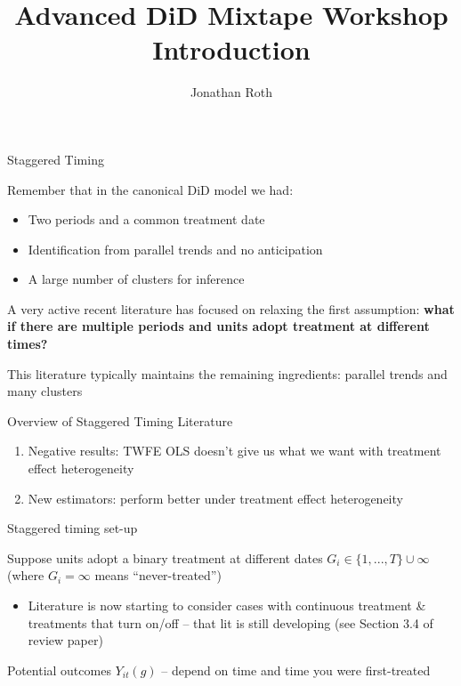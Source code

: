 \documentclass[aspectratio = 169, 13pt]{beamer}
\author{Jonathan Roth}
\title[Advanced DiD Mixtape Workshop]{Advanced DiD Mixtape Workshop \\ Introduction}
\begin{document}

\begin{frame}{Staggered Timing}
  \begin{wideitemize}
    \item
    Remember that in the canonical DiD model we had:

    \begin{itemize}
      \item
            Two periods and a common treatment date

      \item
            Identification from parallel trends and no anticipation

      \item
            A large number of clusters for inference
    \end{itemize}

    \item
    A very active recent literature has focused on relaxing the first assumption: \textbf{what if there are multiple periods and units adopt treatment at different times?}

    \item
    This literature typically maintains the remaining ingredients: parallel trends and many clusters

  \end{wideitemize}

\end{frame}


\begin{frame}{Overview of Staggered Timing Literature}

  \begin{enumerate}
    \item
          Negative results: TWFE OLS doesn't give us what we want with treatment effect heterogeneity

    \item
          New estimators: perform better under treatment effect heterogeneity
  \end{enumerate}


\end{frame}

\begin{frame}{Staggered timing set-up}
  \begin{wideitemize}

    \item
    Suppose units adopt a binary treatment at different dates $G_i \in \{1,...,T \} \cup \infty$ (where $G_i = \infty$ means ``never-treated'')
    \begin{itemize}
      \item
            Literature is now starting to consider cases with continuous treatment \& treatments that turn on/off -- that lit is still developing (see Section 3.4 of review paper)
    \end{itemize}

    \item
    Potential outcomes $Y_{it}(g)$ -- depend on time and time you were first-treated

  \end{wideitemize}
\end{frame}
\end{document}
